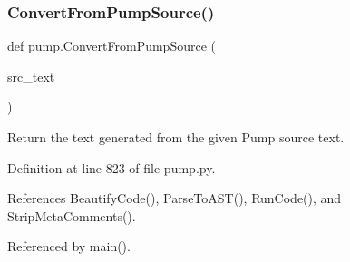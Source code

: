 \subsubsection{\texorpdfstring{Convert\+From\+Pump\+Source()}{ConvertFromPumpSource()}}
{\footnotesize\ttfamily def pump.\+Convert\+From\+Pump\+Source (\begin{DoxyParamCaption}\item[{}]{src\+\_\+text }\end{DoxyParamCaption})}

\begin{DoxyVerb}Return the text generated from the given Pump source text.\end{DoxyVerb}
 

Definition at line 823 of file pump.\+py.



References Beautify\+Code(), Parse\+To\+A\+S\+T(), Run\+Code(), and Strip\+Meta\+Comments().



Referenced by main().


